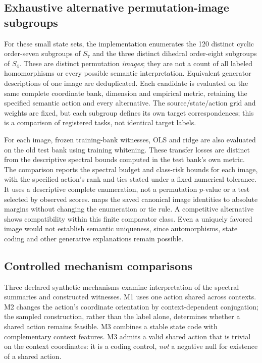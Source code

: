 \subsection{Exhaustive alternative permutation-image subgroups}
For these small state sets, the implementation enumerates the 120 distinct cyclic order-seven subgroups of $S_7$ and the three distinct dihedral order-eight subgroups of $S_4$. These are distinct permutation \emph{images}; they are not a count of all labeled homomorphisms or every possible semantic interpretation. Equivalent generator descriptions of one image are deduplicated. Each candidate is evaluated on the same complete coordinate bank, dimension and empirical metric, retaining the specified semantic action and every alternative. The source/state/action grid and weights are fixed, but each subgroup defines its own target correspondences; this is a comparison of registered tasks, not identical target labels.

For each image, frozen training-bank witnesses, OLS and ridge are also evaluated on the old test bank using training whitening. These transfer losses are distinct from the descriptive spectral bounds computed in the test bank's own metric. The comparison reports the spectral budget and class-risk bounds for each image, with the specified action's rank and ties stated under a fixed numerical tolerance. It uses a descriptive complete enumeration, not a permutation $p$-value or a test selected by observed scores.  maps the saved canonical image identities to absolute margins without changing the enumeration or tie rule. A competitive alternative shows compatibility within this finite comparator class. Even a uniquely favored image would not establish semantic uniqueness, since automorphisms, state coding and other generative explanations remain possible.

\subsection{Controlled mechanism comparisons}
Three declared synthetic mechanisms examine interpretation of the spectral summaries and constructed witnesses. M1 uses one action shared across contexts. M2 changes the action's coordinate orientation by context-dependent conjugation; the sampled construction, rather than the label alone, determines whether a shared action remains feasible. M3 combines a stable state code with complementary context features. M3 admits a valid shared action that is trivial on the context coordinates: it is a coding control, \emph{not} a negative null for existence of a shared action.

